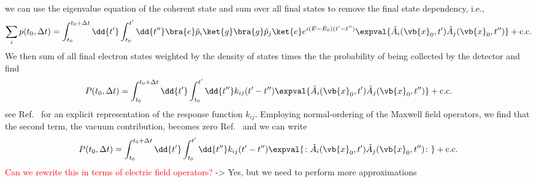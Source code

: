 we can use the eigenvalue equation of the coherent state and sum over all final states to remove the final state dependency, i.e.,
\begin{equation}
	\sum_i
	p(t_0,\Delta t)
	=
	\int_{t_0}^{t_0+\Delta t}\dd{t^\prime}
	\int_{t_0}^{t^\prime}\dd{t^{\prime\prime}}
	\bra{e}\hat{p}_i\ket{g}
	\bra{g}\hat{p}_j\ket{e}
	e^{i(E-E_0)(t^\prime-t^{\prime\prime})}
	\expval{\hat{A}_i(\vb{x}_0,t^\prime)\hat{A}_j(\vb{x}_0,t^{\prime\prime})}
	+
	\text{c.c.}
\end{equation}
We then sum of all final electron states weighted by the density of states times the the probability of being collected by the detector and find
\begin{equation}
	P(t_0,\Delta t)
	=
	\int_{t_0}^{t_0+\Delta t}\dd{t^\prime}
	\int_{t_0}^{t^\prime}\dd{t^{\prime\prime}}
	k_{ij}(t^\prime-t^{\prime\prime})
	\expval{\hat{A}_i(\vb{x}_0,t^\prime)\hat{A}_j(\vb{x}_0,t^{\prime\prime})}
	+
	\text{c.c.}
\end{equation}
see Ref.~\cite[p.~694]{Mandel1995} for an explicit representation of the response function $k_{ij}$.
Employing normal-ordering of the Maxwell field operators, we find that the second term, the vacuum contribution, becomes zero Ref.~\cite[p.~694]{Mandel1995} and we can write
\begin{equation}
	P(t_0,\Delta t)
	=
	\int_{t_0}^{t_0+\Delta t}\dd{t^\prime}
	\int_{t_0}^{t^\prime}\dd{t^{\prime\prime}}
	k_{ij}(t^\prime-t^{\prime\prime})
	\expval{\colon\hat{A}_i(\vb{x}_0,t^\prime)\hat{A}_j(\vb{x}_0,t^{\prime\prime})\colon}
	+
	\text{c.c.}
\end{equation}
\textcolor{red}{Can we rewrite this in terms of electric field operators?} -> Yes, but we need to perform more approximations

